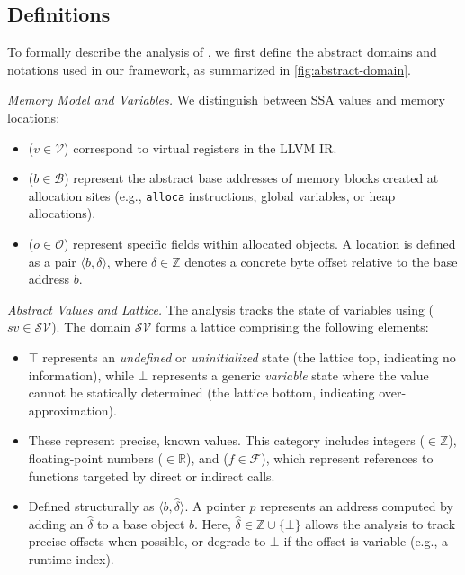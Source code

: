 \subsection{Definitions}\label{sec:design:definitions}

To formally describe the analysis of \mysys, we first define the abstract domains and notations used in our framework, as summarized in \autoref{fig:abstract-domain}.

\textit{Memory Model and Variables.}
We distinguish between SSA values and memory locations:
\begin{itemize}
	\item {} ($v \in \mathcal{V}$) correspond to virtual registers in the LLVM IR.
	\item {} ($b \in \mathcal{B}$) represent the abstract base addresses of memory blocks created at allocation sites (e.g., \texttt{alloca} instructions, global variables, or heap allocations).
	\item {} ($o \in \mathcal{O}$) represent specific fields within allocated objects. A location is defined as a pair $\langle b, \delta \rangle$, where $\delta \in \mathbb{Z}$ denotes a concrete byte offset relative to the base address $b$.
\end{itemize}

\textit{Abstract Values and Lattice.}
The analysis tracks the state of variables using  ($sv \in \mathcal{SV}$). The domain $\mathcal{SV}$ forms a lattice comprising the following elements:
\begin{itemize}
	\item {} $\top$ represents an \textit{undefined} or \textit{uninitialized} state (the lattice top, indicating no information), while $\bot$ represents a generic \textit{variable} state where the value cannot be statically determined (the lattice bottom, indicating over-approximation).
	\item {} These represent precise, known values. This category includes integers ($\in \mathbb{Z}$), floating-point numbers ($\in \mathbb{R}$), and  ($f \in \mathcal{F}$), which represent references to functions targeted by direct or indirect calls.
	\item {} Defined structurally as $\langle b, \hat{\delta} \rangle$. A pointer $p$ represents an address computed by adding an  $\hat{\delta}$ to a base object $b$. Here, $\hat{\delta} \in \mathbb{Z} \cup \{\bot\}$ allows the analysis to track precise offsets when possible, or degrade to $\bot$ if the offset is variable (e.g., a runtime index).
\end{itemize}

